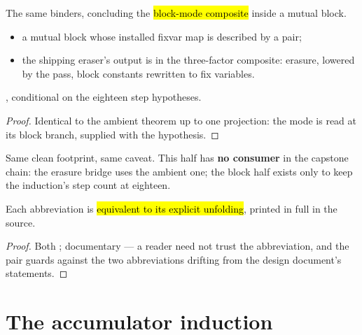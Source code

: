 \begin{theorem}
\label{thm:visitExpr_refines_erasesLBFix}
\leanok
{}
 The same binders, concluding the \hl{block-mode composite} inside a mutual block.
\begin{itemize}
\item {} a mutual block whose installed fixvar map is described by a  pair;
\item {} the shipping eraser's output is in the three-factor composite: erasure, lowered by the
pass, block constants rewritten to fix variables.
\end{itemize}
 \stProved{}, conditional on the eighteen step hypotheses.
\end{theorem}
\begin{proof}
\leanok
{}
 Identical to the ambient theorem up to one projection: the mode is read at its block branch,
supplied with the  hypothesis.
\end{proof}

\begin{remark}
 Same clean footprint, same caveat. This half has \textbf{no consumer} in the capstone
chain: the erasure bridge uses the ambient one; the block half exists only to keep the induction's step
count at eighteen.
\end{remark}

\begin{lemma}
\label{lem:visitExpr_refines_erasesLB_shape}
\leanok
{}
 Each abbreviation is \hl{equivalent to its explicit unfolding}, printed in full in the
source.
\end{lemma}
\begin{proof}
\leanok
{}
 Both ; documentary --- a reader need not trust the abbreviation, and the pair
guards against the two abbreviations drifting from the design document's statements.
\end{proof}

\section{The accumulator induction}
\label{sec:refinement:acc}

